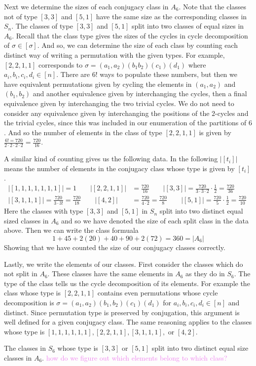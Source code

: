 \documentclass[12pt,letterpaper,boxed]{hmcpset}
\newcommand{\wg}[1]{\textcolor{violet}{#1}}
\newcommand{\abs}[1]{\left|#1\right|}
\begin{document}
\begin{solution}
Next we determine the sizes of each conjugacy class in $A_6$. 
Note that the classes not of type $[3,3]$ and $[5,1]$ have the same
size as the corresponding classes in $S_n$. The classes of type
$[3,3]$ and $[5,1]$ split into two classes of equal sizes in $A_6$. 
Recall that the class type gives the sizes of the cycles in cycle
decomposition of $\sigma \in [\sigma]$. And so, we can determine the
size of each class by counting each distinct way of writing a
permutation with the given types.
For example, $[2,2,1,1]$ corresponds to $\sigma = (a_1,
a_2)(b_1b_2)(c_1)(d_1)$ where $a_i, b_i, c_i, d_i \in [n]$.
There are $6!$ ways to populate these numbers, but then we have
equivalent permutations given by cycling the elements in $(a_1,a_2)$
and $(b_1, b_2)$ and another equivalence given by interchanging the
cycles, then a final equivalence given by interchanging the two
trivial cycles. We do not need to consider any equivalence given by
interchanging the positions of the $2$-cycles and the trivial cycles,
since this was included in our enumeration of the partitions of $6$.
And so the number of elements in the class of type
$[2,2,1,1]$
is given by $\frac{6! = 720}{2 \cdot 2 \cdot 2 \cdot 2} = \frac{720}{16}$. 

A similar kind of counting gives us the following data. In the
following $\abs{[t_i]}$ means the number of elements in the
conjugacy class whose type is given by $[t_i]$.
\begin{align*}
	\abs{[1,1,1,1,1,1,1]} = 1 \qquad
	\abs{[2,2,1,1]} &= \frac{720}{16} \qquad
	\abs{[3,3]} = \frac{720}{3 \cdot 3 \cdot 2} \cdot \frac{1}{2} = \frac{720}{36} \qquad \\
	\abs{[3,1,1,1]} = \frac{720}{3 \cdot 3!} = \frac{720}{18} \qquad
	\abs{[4,2]} &= \frac{720}{4 \cdot 2} = \frac{720}{8} \qquad
	\abs{[5,1]} = \frac{720}{5} \cdot \frac{1}{2} = \frac{720}{10}
\end{align*}
Here the classes with type $[3,3]$ and $[5,1]$ in $S_n$ split into two
distinct equal sized classes in $A_6$ and so we have denoted the size
of each split class in the data above. Then we can write the class
formuala
\[
	1 + 45 + 2(20) + 40 + 90 + 2(72) = 360 = \abs{A_6}
\]
Showing that we have counted the size of our conjugacy classes
correctly.

Lastly, we write the elements of our classes. First consider the
classes which do not split in $A_6$. These classes have the same
elements in $A_6$ as they do in $S_6$. The type of the class tells us
the cycle decomposition of its elements. For example the class whose
type is $[2,2,1,1]$ contains even permutations whose cycle
decomposition is $\sigma = (a_1, a_2)(b_1, b_2)(c_1)(d_1)$ for $a_i,
b_i, c_i, d_i \in [n]$ and distinct. Since permutation type is
preserved by conjugation, this argument is well defined for a given
conjugacy class.
The same reasoning applies to the classes whose type is
$[1,1,1,1,1,1], [2,2,1,1], [3,1,1,1],$ or $[4,2]$.

The classes in $S_6$ whose type is $[3,3]$ or $[5,1]$ split into two distinct
equal size classes in $A_6$. 
\wg{how do we figure out which elements belong to which class?}



\end{solution}
\end{document}
